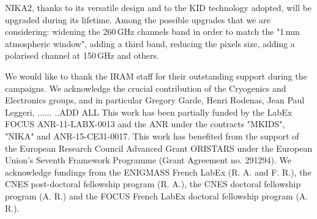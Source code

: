 \documentclass[]{aa} %
\begin{document}
NIKA2, thanks to its versatile design and to the KID technology adopted, will be upgraded during its lifetime. Among the possible upgrades that we are considering: widening the 260\,GHz channels band in order to match the "1\,mm atmospheric window", adding a third band, reducing the pixels size, adding a polarised channel at 150\,GHz and others. 



\begin{acknowledgements}
We would like to thank the IRAM staff for their outstanding support during the campaigns. 
We acknowledge the crucial contribution of the Cryogenics and Electronics groups, and 
in particular Gregory Garde, Henri Rodenas, Jean Paul Leggeri, ...... ..ADD ALL
This work has been partially funded by the LabEx FOCUS ANR-11-LABX-0013 and 
the ANR under the contracts "MKIDS", "NIKA" and ANR-15-CE31-0017. 
This work has benefited from the support of the European Research Council Advanced Grant ORISTARS under the European Union's Seventh Framework Programme (Grant Agreement no. 291294).
We acknowledge fundings from the ENIGMASS French LabEx (R. A. and F. R.), 
the CNES post-doctoral fellowship program (R. A.),  the CNES doctoral fellowship program (A. R.) and the FOCUS French LabEx doctoral fellowship program (A. R.).


\end{acknowledgements}


%
%


%
% 
\end{document}
